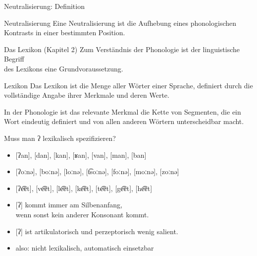 \begin{frame}
  {Neutralisierung: Definition}
  \pause
  \Large
  \begin{block}{Neutralisierung}
    Eine Neutralisierung ist die Aufhebung eines phonologischen Kontrasts in einer bestimmten Position.    
  \end{block}
\end{frame}

\begin{frame}
  {Das Lexikon (Kapitel 2)}
  \pause
  \large Zum Verständnis der Phonologie ist der linguistische Begriff\\
  des Lexikons eine Grundvoraussetzung.\\
  \Large
  \Zeile
  \pause
  \begin{block}{Lexikon}
    Das \alert{Lexikon} ist die Menge aller Wörter einer Sprache, definiert durch die vollständige Angabe ihrer Merkmale und deren Werte.    
  \end{block}
  \pause
  \Zeile
  \large
  In der Phonologie ist das relevante Merkmal die \alert{Kette von Segmenten}, die ein Wort eindeutig definiert und von allen anderen Wörtern unterscheidbar macht.
\end{frame}

\begin{frame}
  {Muss man ʔ lexikalisch spezifizieren?}
  \pause
  \begin{itemize}[<+->]
    \item{[ʔan], [dan], [kan], [ʁan], [van], [man], [ban]}
    \item{[ʔoːnə], [boːnə], [loːnə], [t͡soːnə], [foːnə], [moːnə], [zoːnə]}
    \item{[ʔe͡ɐt], [ve͡ɐt], [le͡ɐt], [ke͡ɐt], [te͡ɐt], [ge͡ɐt], [he͡ɐt]}
  \end{itemize}
  \Zeile
  \pause
  \begin{itemize}[<+->]
    \item{\alert{[ʔ] kommt immer am Silbenanfang,\\
      wenn sonst kein anderer Konsonant kommt.}}
    \item{[ʔ] ist artikulatorisch und perzeptorisch wenig salient.}
    \item also: nicht lexikalisch, \alert{automatisch einsetzbar}
  \end{itemize}
\end{frame}

